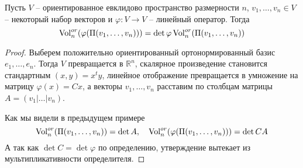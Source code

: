 \begin{claim}
Пусть $V$ -- ориентированное евклидово пространство размерности $n$, $v_1,\ldots,v_n\in V$ -- некоторый набор векторов и $\varphi\colon V\to V$ -- линейный оператор. Тогда 
\[
\operatorname{Vol}^{or}_n(\varphi(\Pi(v_1,\ldots,v_n))) = \det \varphi \operatorname{Vol}^{or}_n(\Pi(v_1,\ldots,v_n))
\]
\end{claim}
\begin{proof}
Выберем положительно ориентированный ортонормированный базис $e_1,\ldots,e_n$. Тогда $V$ превращается в $\mathbb R^n$, скалярное произведение становится стандартным $(x, y) = x^t y$, линейное отображение превращается в умножение на матрицу $\varphi(x) = Cx$, а векторы $v_1,\ldots,v_n$ расставим по столбцам матрицы $A = (v_1|\ldots|v_n)$.

Как мы видели в предыдущем примере
\[
\operatorname{Vol}^{or}_n(\Pi(v_1,\ldots,v_n)) = \det A,\quad
\operatorname{Vol}^{or}_n(\varphi(\Pi(v_1,\ldots,v_n))) = \det CA
\]
А так как $\det C = \det \varphi$ по определению, утверждение вытекает из мультипликативности определителя.
\end{proof}
